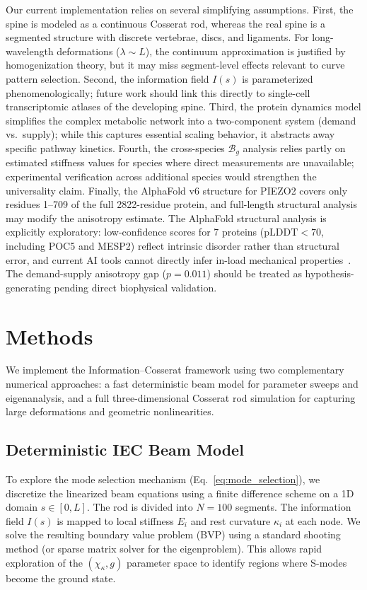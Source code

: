\documentclass[11pt]{article}
\begin{document}
Our current implementation relies on several simplifying assumptions. First, the spine is modeled as a continuous Cosserat rod, whereas the real spine is a segmented structure with discrete vertebrae, discs, and ligaments. For long-wavelength deformations ($\lambda \sim L$), the continuum approximation is justified by homogenization theory, but it may miss segment-level effects relevant to curve pattern selection. Second, the information field $I(s)$ is parameterized phenomenologically; future work should link this directly to single-cell transcriptomic atlases of the developing spine. Third, the protein dynamics model simplifies the complex metabolic network into a two-component system (demand vs.\ supply); while this captures essential scaling behavior, it abstracts away specific pathway kinetics. Fourth, the cross-species $\mathcal{B}_g$ analysis relies partly on estimated stiffness values for species where direct measurements are unavailable; experimental verification across additional species would strengthen the universality claim. Finally, the AlphaFold v6 structure for PIEZO2 covers only residues 1--709 of the full 2822-residue protein, and full-length structural analysis may modify the anisotropy estimate.
The AlphaFold structural analysis is explicitly exploratory: low-confidence scores for 7 proteins ($\text{pLDDT} < 70$, including POC5 and MESP2) reflect intrinsic disorder rather than structural error, and current AI tools cannot directly infer in-load mechanical properties~\cite{gomes2022protein}. The demand-supply anisotropy gap ($p = 0.011$) should be treated as hypothesis-generating pending direct biophysical validation.

\section*{Methods}

We implement the Information--Cosserat framework using two complementary numerical approaches: a fast deterministic beam model for parameter sweeps and eigenanalysis, and a full three-dimensional Cosserat rod simulation for capturing large deformations and geometric nonlinearities.

\subsection{Deterministic IEC Beam Model}

To explore the mode selection mechanism (Eq.~\ref{eq:mode_selection}), we discretize the linearized beam equations using a finite difference scheme on a 1D domain $s \in [0, L]$. The rod is divided into $N=100$ segments. The information field $I(s)$ is mapped to local stiffness $E_i$ and rest curvature $\kappa_{i}$ at each node. We solve the resulting boundary value problem (BVP) using a standard shooting method (or sparse matrix solver for the eigenproblem). This allows rapid exploration of the $(\chi_\kappa, g)$ parameter space to identify regions where S-modes become the ground state.
\end{document}
